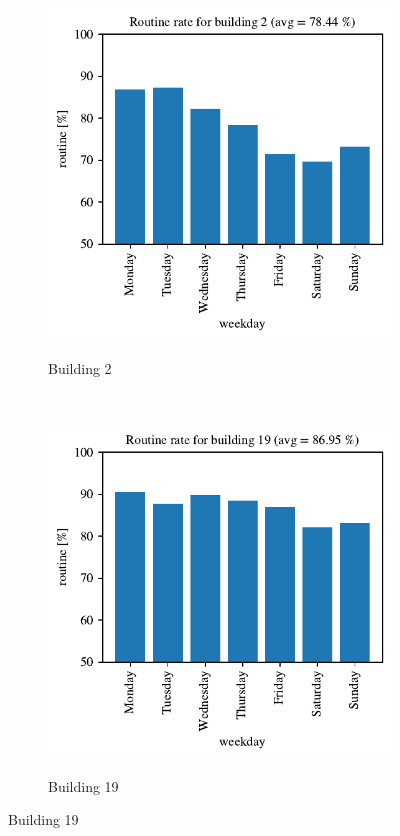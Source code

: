 \begin{figure}[H]
	\begin{subfigure}{.5\textwidth}
		\caption{Building 2}
		\includegraphics[width=1\linewidth]{../Figures/EC/b2week.pdf}
		\label{fig:ec_b2week}
	\end{subfigure}%
	~ 
	\begin{subfigure}{.5\textwidth}
		\caption{Building 19}
		\includegraphics[width=1\linewidth]{../Figures/EC/b19week.pdf}
		\label{fig:ec_b19week}
	\end{subfigure}%
    \bigskip


\end{figure}
